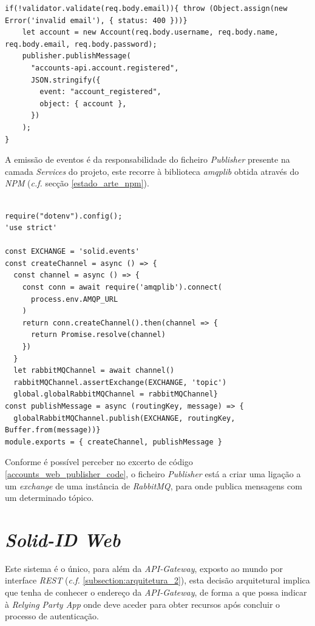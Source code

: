\begin{lstlisting}[caption={\emph{AccountController} responsável por validar e propagar informação do utilizador}, label={accounts_web_account_controller}]
if(!validator.validate(req.body.email)){ throw (Object.assign(new Error('invalid email'), { status: 400 }))}
    let account = new Account(req.body.username, req.body.name, req.body.email, req.body.password);
    publisher.publishMessage(
      "accounts-api.account.registered",
      JSON.stringify({
        event: "account_registered",
        object: { account },
      })
    );
}
\end{lstlisting}

A emissão de eventos é da responsabilidade do ficheiro \emph{Publisher} presente na camada \emph{Services} do projeto, este recorre à biblioteca \emph{amqplib} obtida através do \emph{NPM} (\emph{c.f.} secção \ref{estado_arte_npm}).

\begin{lstlisting}[caption={\emph{Publisher} responsável por emitir os eventos para o \emph{RabbitMQ}}, label={accounts_web_publisher_code}]

require("dotenv").config();
'use strict'

const EXCHANGE = 'solid.events'
const createChannel = async () => {
  const channel = async () => {
    const conn = await require('amqplib').connect(
      process.env.AMQP_URL
    )
    return conn.createChannel().then(channel => {
      return Promise.resolve(channel)
    })
  }
  let rabbitMQChannel = await channel()
  rabbitMQChannel.assertExchange(EXCHANGE, 'topic')
  global.globalRabbitMQChannel = rabbitMQChannel}
const publishMessage = async (routingKey, message) => {
  globalRabbitMQChannel.publish(EXCHANGE, routingKey, Buffer.from(message))}
module.exports = { createChannel, publishMessage }
\end{lstlisting}

Conforme é possível perceber no excerto de código \ref{accounts_web_publisher_code}, o ficheiro \emph{Publisher} está a criar uma ligação a um \emph{exchange} de uma instância de \emph{RabbitMQ}, para onde publica mensagens com um determinado tópico.

\section{\emph{Solid-ID Web}}
Este sistema é o único, para além da \emph{API-Gateway}, exposto ao mundo por interface \emph{\acrshort{REST}} (\emph{c.f.} \ref{subsection:arquitetura_2}), esta decisão arquitetural implica que tenha de conhecer o endereço da \emph{API-Gateway}, de forma a que possa indicar à \emph{Relying Party App} onde deve aceder para obter recursos após concluir o processo de autenticação.

